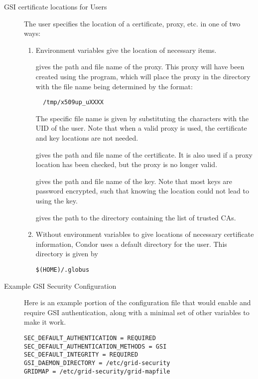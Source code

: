 \begin{description}
\item[GSI certificate locations for Users]

The user specifies the location of a certificate, proxy, etc.
in one of two ways:
\begin{enumerate}
\item
Environment variables give the location of necessary items.

   gives the path and file name of the proxy.
  This proxy will have been created using the  program, 
  which will place the proxy in the 
  directory with the file name being determined by the format:
  \begin{verbatim}
  /tmp/x509up_uXXXX
  \end{verbatim}
  The specific file name is given by substituting the \verb@XXXX@
  characters with the UID of the user.
  Note that when a valid proxy is used, the certificate and key locations
  are not needed. 

   gives the path and file name of the
  certificate. It is also used if a proxy location has been checked,
  but the proxy is no longer valid.  

   gives the path and file name of the
  key. Note that most keys are password encrypted, such that knowing
  the location could not lead to using the key. 

   gives the path to the directory 
  containing the list of trusted CAs. 

\item
Without environment variables to give locations of necessary
certificate information,
Condor uses a default directory for the user.
This directory is given by 
\begin{verbatim}
$(HOME)/.globus
\end{verbatim}
\end{enumerate}

\item[Example GSI Security Configuration]

Here is an example portion of the configuration file that would
enable and require GSI authentication,
along with a minimal set of other variables to make it work. 

\footnotesize
\begin{verbatim}
SEC_DEFAULT_AUTHENTICATION = REQUIRED
SEC_DEFAULT_AUTHENTICATION_METHODS = GSI
SEC_DEFAULT_INTEGRITY = REQUIRED
GSI_DAEMON_DIRECTORY = /etc/grid-security
GRIDMAP = /etc/grid-security/grid-mapfile


\end{verbatim}
\end{description}
